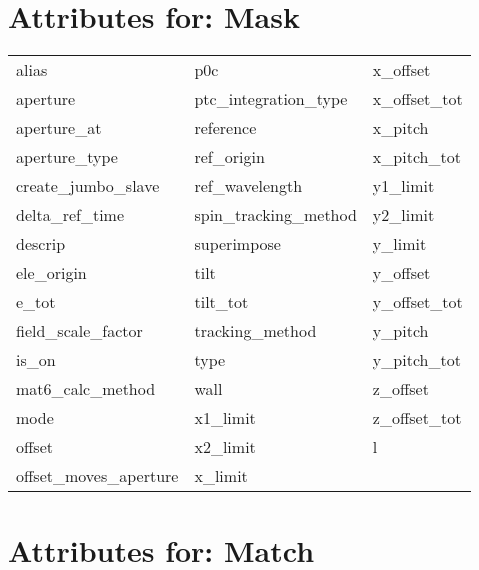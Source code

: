  \section{Attributes for: Mask}
 \label{s:list.mask}
 
 \begin{tabular}{lll} \toprule
alias                       & p0c                         & x_offset                    \\
aperture                    & ptc_integration_type        & x_offset_tot                \\
aperture_at                 & reference                   & x_pitch                     \\
aperture_type               & ref_origin                  & x_pitch_tot                 \\
create_jumbo_slave          & ref_wavelength              & y1_limit                    \\
delta_ref_time              & spin_tracking_method        & y2_limit                    \\
descrip                     & superimpose                 & y_limit                     \\
ele_origin                  & tilt                        & y_offset                    \\
e_tot                       & tilt_tot                    & y_offset_tot                \\
field_scale_factor          & tracking_method             & y_pitch                     \\
is_on                       & type                        & y_pitch_tot                 \\
mat6_calc_method            & wall                        & z_offset                    \\
mode                        & x1_limit                    & z_offset_tot                \\
offset                      & x2_limit                    & l                           \\
offset_moves_aperture       & x_limit                     &                             \\
 \bottomrule
 \end{tabular}
 \vfill
 
 \section{Attributes for: Match}
 \label{s:list.match}
 
